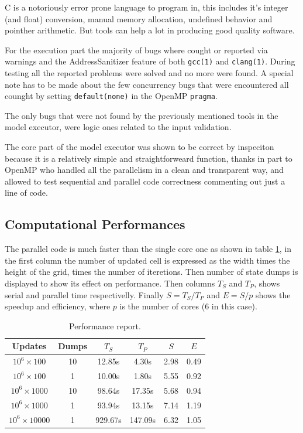 \documentclass[Lau]{sapthesis} %
\begin{document}
C is a notoriously error prone language to program in, this includes
it's integer (and float) conversion, manual memory allocation,
undefined behavior and pointher arithmetic. But tools can help a
lot in producing good quality software.

For the execution part the majority of bugs where cought or reported via
warnings and the AddressSanitizer \cite{asan} feature of both \texttt{gcc(1)}
and \texttt{clang(1)}. During testing all the reported problems were solved and
no more were found. A special note has to be made about the few concurrency bugs
that were encountered all counght by setting \texttt{default(none)} in the
OpenMP \texttt{pragma}.

The only bugs that were not found by the previously mentioned tools in the model
executor, were logic ones related to the input validation.

The core part of the model executor was shown to be correct by inspeciton
because it is a relatively simple and straightforweard function, thanks in part
to OpenMP who handled all the parallelism in a clean and transparent way, and
allowed to test sequential and parallel code correctness commenting out just a
line of code.

\subsection{Computational Performances}

The parallel code is much faster than the single core one as shown in table
\ref{tab:performance}, in the first column the number of updated cell is
expressed as the width times the height of the grid, times the number of
iteretions. Then number of state dumps is displayed to show its effect on
performance. Then columns $T_S$ and $T_P$, shows serial and parallel time
respectivelly. Finally $S = T_S/T_P$ and $E = S/p$ shows the speedup and
efficiency, where $p$ is the number of cores (6 in this case).

\begin{table}
\centering
\begin{tabular}{|c|c|c|c|c|c|}
\hline
\textbf{Updates} & \textbf{Dumps} & \textbf{$T_S$} & \textbf{$T_P$} & \textbf{$S$} & \textbf{$E$}\\
\hline
$10^6\times 100$ & 10 & 12.85s & 4.30s & 2.98 & 0.49\\
$10^6\times 100$ & 1 & 10.00s & 1.80s & 5.55 & 0.92\\
$10^6\times 1000$ & 10 & 98.64s & 17.35s & 5.68 & 0.94\\
$10^6\times 1000$ & 1 & 93.94s & 13.15s & 7.14 & 1.19\\
$10^6\times 10000$ & 1 & 929.67s & 147.09s & 6.32 & 1.05\\
\hline
\end{tabular}
\caption{Performance report.}
\label{tab:performance}
\end{table}
\end{document}

